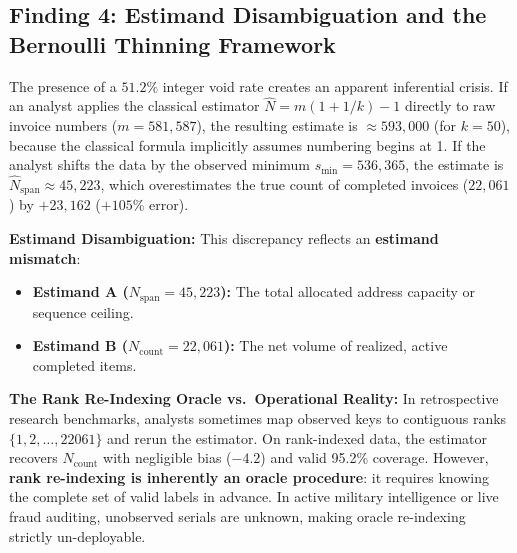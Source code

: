 \documentclass[10pt,a4paper]{article}
\begin{document}
\subsection{Finding 4: Estimand Disambiguation and the Bernoulli Thinning Framework}
\label{sec:thinning_model}
The presence of a $51.2\%$ integer void rate creates an apparent inferential crisis. If an analyst applies the classical estimator $\hat{N} = m(1 + 1/k) - 1$ directly to raw invoice numbers ($m = 581,587$), the resulting estimate is $\approx 593,000$ (for $k=50$), because the classical formula implicitly assumes numbering begins at 1. If the analyst shifts the data by the observed minimum $s_{\min} = 536,365$, the estimate is $\widehat{N}_{\text{span}} \approx 45,223$, which overestimates the true count of completed invoices ($22,061$) by $+23,162$ ($+105\%$ error).

\textbf{Estimand Disambiguation:} This discrepancy reflects an \textbf{estimand mismatch}:
\begin{itemize}
    \item \textbf{Estimand A ($N_{\text{span}} = 45,223$):} The total allocated address capacity or sequence ceiling.
    \item \textbf{Estimand B ($N_{\text{count}} = 22,061$):} The net volume of realized, active completed items.
\end{itemize}

\textbf{The Rank Re-Indexing Oracle vs.\ Operational Reality:} In retrospective research benchmarks, analysts sometimes map observed keys to contiguous ranks $\{1, 2, \dots, 22061\}$ and rerun the estimator. On rank-indexed data, the estimator recovers $N_{\text{count}}$ with negligible bias ($-4.2$) and valid 95.2\% coverage. However, \textbf{rank re-indexing is inherently an oracle procedure}: it requires knowing the complete set of valid labels in advance. In active military intelligence or live fraud auditing, unobserved serials are unknown, making oracle re-indexing strictly un-deployable.
\end{document}
